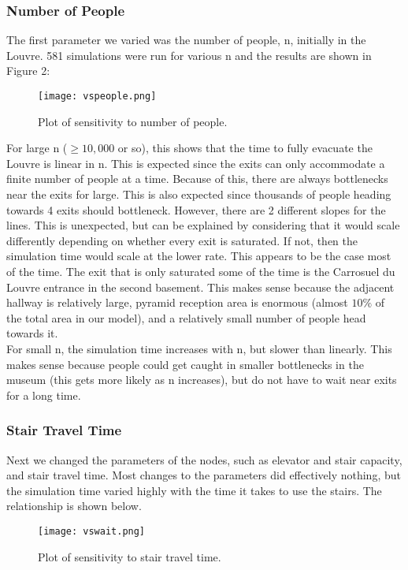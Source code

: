 \documentclass[12pt]{article}
\begin{document}
\subsubsection{Number of People}
The first parameter we varied was the number of people, n, initially in the Louvre. 581 simulations were run for various n and the results are shown in Figure 2:
\begin{figure}[H]
	\centering
	\texttt{[image: vspeople.png]}
    \caption{Plot of sensitivity to number of people.}
\end{figure}
For large n ($\geq 10,000$ or so), this shows that the time to fully evacuate the Louvre is linear in n. This is expected since the exits can only accommodate a finite number of people at a time. Because of this, there are always bottlenecks near the exits for large. This is also expected since thousands of people heading towards 4 exits should bottleneck. However, there are 2 different slopes for the lines. This is unexpected, but can be explained by considering that it would scale differently depending on whether every exit is saturated. If not, then the simulation time would scale at the lower rate. This appears to be the case most of the time. The exit that is only saturated some of the time is the Carrosuel du Louvre entrance in the second basement. This makes sense because the adjacent hallway is relatively large, pyramid reception area is enormous (almost $10\%$ of the total area in our model), and a relatively small number of people head towards it.\\

For small n, the simulation time increases with n, but slower than linearly. This makes sense because people could get caught in smaller bottlenecks in the museum (this gets more likely as n increases), but do not have to wait near exits for a long time.

\subsubsection{Stair Travel Time}
Next we changed the parameters of the nodes, such as elevator and stair capacity, and stair travel time. Most changes to the parameters did effectively nothing, but the simulation time varied highly with the time it takes to use the stairs. The relationship is shown below.

\begin{figure}[H]
	\centering
	\texttt{[image: vswait.png]}
    \caption{Plot of sensitivity to stair travel time.}
\end{figure}
\end{document}
